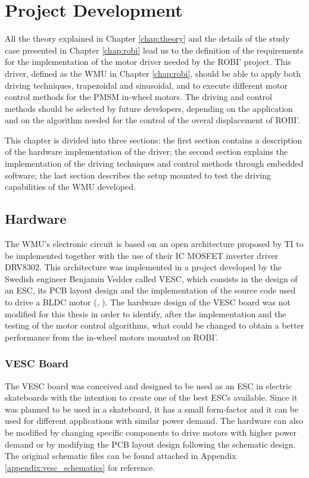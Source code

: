 \chapter{Project Development} \label{chap:implementation}

All the theory explained in Chapter \ref{chap:theory} and the details of the study case presented in Chapter \ref{chap:robi} lead us to the definition of the requirements for the implementation of the motor driver needed by the ROBI' project. This driver, defined as the \ac{WMU} in Chapter \ref{chap:robi}, should be able to apply both driving techniques, trapezoidal and sinusoidal, and to execute different motor control methods for the \ac{PMSM} in-wheel motors. The driving and control methods should be selected by future developers, depending on the application and on the algorithm needed for the control of the overal displacement of ROBI'.

This chapter is divided into three sections: the first section contains a description of the hardware implementation of the driver; the second section explains the implementation of the driving techniques and control methods through embedded software; the last section describes the setup mounted to test the driving capabilities of the \ac{WMU} developed.

\section{Hardware}

The \ac{WMU}'s electronic circuit is based on an open architecture proposed by \acf{TI} to be implemented together with the use of their \ac{IC} \ac{MOSFET} inverter driver DRV8302. This architecture was implemented in a project developed by the Swedish engineer Benjamin Vedder called VESC, which consists in the design of an \acf{ESC}, its \ac{PCB} layout design and the implementation of the source code used to drive a \ac{BLDC} motor (\citeauthor{VedderVesc}, \citeyear{VedderVesc}). The hardware design of the VESC board was not modified for this thesis in order to identify, after the implementation and the testing of the motor control algorithms, what could be changed to obtain a better performance from the in-wheel motors mounted on ROBI'.

\subsection{VESC Board}

The VESC board was conceived and designed to be used as an \ac{ESC} in electric skateboards with the intention to create one of the best \ac{ESC}s available. Since it was planned to be used in a skateboard, it has a small form-factor and it can be used for different applications with similar power demand. The hardware can also be modified by changing specific components to drive motors with higher power demand or by modifying the \ac{PCB} layout design following the schematic design. The original schematic files can be found attached in Appendix \ref{appendix:vesc_schematics} for reference.

